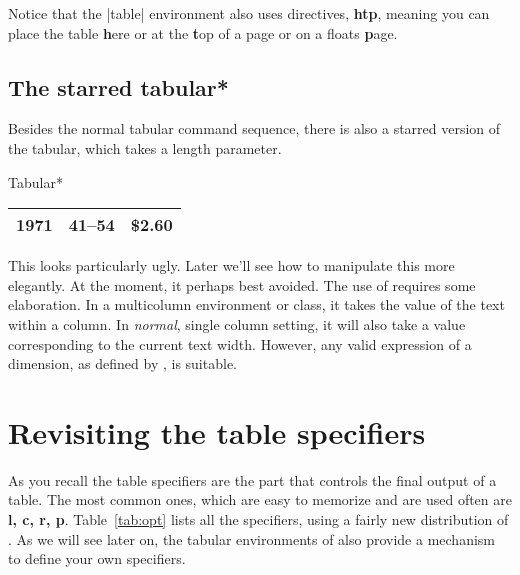 Notice that the |table| environment also uses directives, \textbf{htp}, meaning you can place the table \textbf{h}ere or at the \textbf{t}op of a page or on a floats \textbf{p}age.



\subsection{The starred tabular*}

Besides the normal tabular command sequence, there is also a starred version of the tabular, which takes a length parameter. 

\begin{texexample}{Tabular*}{}
\begin{tabular*}{\linewidth}{|r|c|c|}
\hline
1971 & 41--54 & \$2.60 \\
\hline
\end{tabular*}
\end{texexample}

This looks particularly ugly. Later we'll see how to manipulate
this more elegantly. At the moment, it perhaps best
avoided. The use of \cmd{\linewidth} requires some elaboration.
In a multicolumn environment or class, it takes the value of
the text within a column. In \emph{normal}, single column setting,
it will also take a value corresponding to the current text
width. However, any valid expression of a dimension, as defined by \tex, is suitable.

\section{Revisiting the table specifiers}

As you recall the table specifiers are the part that controls the final output of a table. The most common ones, which are easy to memorize and are used often are \textbf{l, c, r, p}. Table~\ref{tab:opt} lists all the specifiers, using a fairly new distribution of \latexe. As we will see later on, the tabular environments of \latexe also provide a mechanism to define your own specifiers.  

